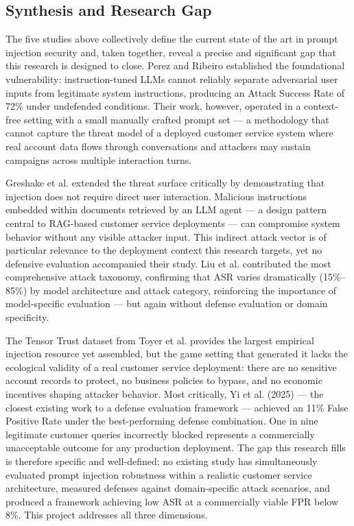 \documentclass[12pt,a4paper]{article}
\begin{document}
\subsection{Synthesis and Research Gap}
The five studies above collectively define the current state of the art in prompt injection security and, taken together, reveal a precise and significant gap that this research is designed to close. Perez and Ribeiro \cite{perez2022} established the foundational vulnerability: instruction-tuned LLMs cannot reliably separate adversarial user inputs from legitimate system instructions, producing an Attack Success Rate of 72\% under undefended conditions. Their work, however, operated in a context-free setting with a small manually crafted prompt set — a methodology that cannot capture the threat model of a deployed customer service system where real account data flows through conversations and attackers may sustain campaigns across multiple interaction turns.

Greshake et al. \cite{greshake2023} extended the threat surface critically by demonstrating that injection does not require direct user interaction. Malicious instructions embedded within documents retrieved by an LLM agent — a design pattern central to RAG-based customer service deployments — can compromise system behavior without any visible attacker input. This indirect attack vector is of particular relevance to the deployment context this research targets, yet no defensive evaluation accompanied their study. Liu et al. \cite{liu2023} contributed the most comprehensive attack taxonomy, confirming that ASR varies dramatically (15\%–85\%) by model architecture and attack category, reinforcing the importance of model-specific evaluation — but again without defense evaluation or domain specificity.

The Tensor Trust dataset from Toyer et al. \cite{toyer2024} provides the largest empirical injection resource yet assembled, but the game setting that generated it lacks the ecological validity of a real customer service deployment: there are no sensitive account records to protect, no business policies to bypass, and no economic incentives shaping attacker behavior. Most critically, Yi et al. (2025) \cite{yi2025} — the closest existing work to a defense evaluation framework — achieved an 11\% False Positive Rate under the best-performing defense combination. One in nine legitimate customer queries incorrectly blocked represents a commercially unacceptable outcome for any production deployment. The gap this research fills is therefore specific and well-defined: no existing study has simultaneously evaluated prompt injection robustness within a realistic customer service architecture, measured defenses against domain-specific attack scenarios, and produced a framework achieving low ASR at a commercially viable FPR below 8\%. This project addresses all three dimensions.
\end{document}
